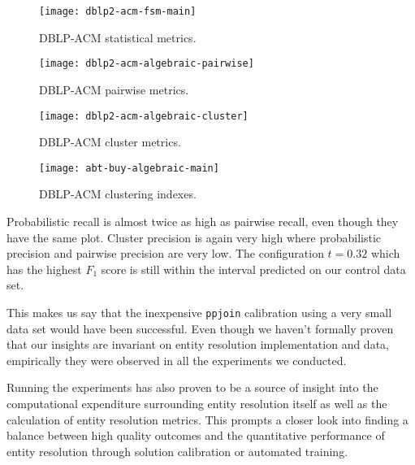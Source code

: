 \begin{figure*}[htbp]
    \begin{minipage}{0.24\textwidth}
        \centering
        \texttt{[image: dblp2-acm-fsm-main]}
        \caption{DBLP-ACM statistical metrics.}\label{fig:dblp2-acm-fsm-main}
    \end{minipage}
    \begin{minipage}{0.24\textwidth}
        \centering
        \texttt{[image: dblp2-acm-algebraic-pairwise]}
        \caption{DBLP-ACM pairwise metrics.}\label{fig:dblp2-acm-algebraic-pairwise}
    \end{minipage}
    \begin{minipage}{0.24\textwidth}
        \centering
        \texttt{[image: dblp2-acm-algebraic-cluster]}
        \caption{DBLP-ACM cluster metrics.}\label{fig:dblp2-acm-algebraic-cluster}
    \end{minipage}
    \begin{minipage}{0.24\textwidth}
        \centering
        \texttt{[image: abt-buy-algebraic-main]}
        \caption{DBLP-ACM clustering indexes.}
        \label{fig:dblp2-acm-algebraic-main}
    \end{minipage}
\end{figure*}\label{dblp2-acm}

Probabilistic recall is almost twice as high as pairwise recall, even though
they have the same plot.
Cluster precision is again very high where probabilistic precision and
pairwise precision are very low.
The configuration $t=0.32$ which has the highest $F_1$ score is still within the
interval predicted on our control data set.

This makes us say that the inexpensive \texttt{ppjoin} calibration using a very
small data set would have been successful.
Even though we haven't formally proven that our insights are invariant on entity
resolution implementation and data, empirically they were observed in all the
experiments we conducted.

Running the experiments has also proven to be a source of insight into the
computational expenditure surrounding entity resolution itself as well as the
calculation of entity resolution metrics.
This prompts a closer look into finding a balance between high quality outcomes
and the quantitative performance of entity resolution through solution
calibration or automated training.